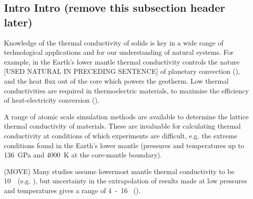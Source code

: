 \documentclass[%
preprint,                                  %
nofootinbib,
 amsmath,amssymb,
 aps,
]{revtex4-1}
\begin{document}
\subsection{\label{sec:intro.intro}Intro Intro (remove this subsection header later)}


Knowledge of the thermal conductivity of solids is key in a wide range of technological applications and for our understanding of natural systems. For example, in the Earth's lower mantle thermal conductivity controls the nature [USED NATURAL IN PRECEDING SENTENCE] of planetary convection (\citet{Tosi2013}), and the heat flux out of the core which powers the geotherm. Low thermal conductivities are required in thermoelectric materials, to maximise the efficiency of heat-electricity conversion (\citet{Snyder2008}).

A range of atomic scale simulation methods are available to determine the lattice thermal conductivity of materials. These are invaluable for calculating thermal conductivity at conditions of which experiments are difficult, e.g. the extreme conditions found in the Earth's lower mantle (pressures and temperatures up to 136~GPa and 4000~K at the core-mantle boundary). 


(MOVE) Many studies assume lowermost mantle thermal conductivity to be 10~\wmk~(e.g. \citet{Lay2008}), but uncertainty in the extrapolation of results made at low pressures and temperatures gives a range of 4~-~16 \wmk~(\citet{Brown1986, Osako1991, Hofmeister1999, Goncharov2009, Manthilake2011, Ohta2012}).

 


\end{document}
